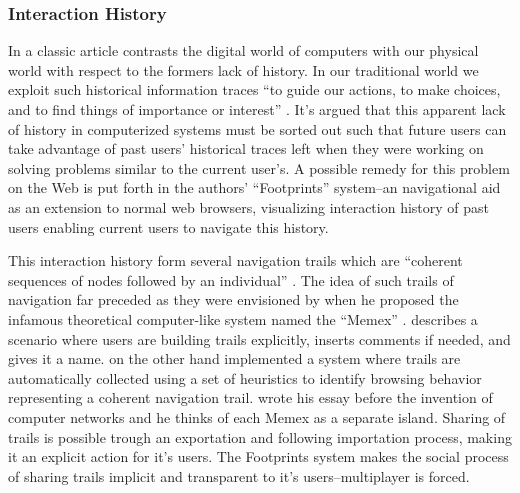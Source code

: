 \subsubsection{Interaction History}

In a classic article \citet{wexelblat99} contrasts the digital world of
computers with our physical world with respect to the formers lack of history.
In our traditional world we exploit such historical information traces
  ``to guide our actions, to make choices, and to find things of
  importance or interest'' \citep[p.~270]{wexelblat99}.
It's argued that this apparent lack of history in computerized systems must
be sorted out such that future users can take advantage
of past users' historical traces left when they were working
on solving problems similar to the current user's.
A possible remedy for this problem on the Web is put forth in the authors'
``Footprints'' system--an navigational aid as an extension to normal web
browsers, visualizing interaction history of past users enabling current
users to navigate this history.

This interaction history form several navigation trails which are
  ``coherent sequences of nodes followed by an individual''
  \citep[p.~273]{wexelblat99}.
The idea of such trails of navigation far preceded \citeauthor{wexelblat99}
as they were envisioned by \citet{bush45} when he proposed the infamous
theoretical computer-like system named the ``Memex''%
.
\citeauthor{bush45} describes a scenario where users are building trails
explicitly, inserts comments if needed, and gives it a name.
\citeauthor{wexelblat99} on the other hand
implemented a system where trails are automatically collected using a set of
heuristics to identify browsing behavior representing a coherent navigation
trail.
\citeauthor{bush45} wrote his essay before the invention of computer networks
and he thinks of each Memex as a separate island. Sharing of trails is
possible trough an exportation and following importation process, making it an
explicit action for it's users.
The Footprints system makes the social process of sharing trails implicit and
transparent to it's users--multiplayer is forced.

